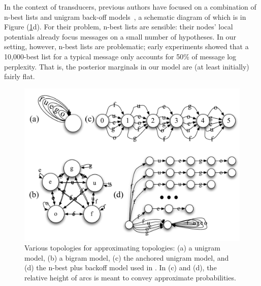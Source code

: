 \documentclass[11pt,a4paper]{article}
\begin{document}
In the context of transducers, previous authors have focused on a
combination of n-best lists and unigram back-off
models~\cite{dreyer2009graphical}, a schematic diagram of which is
in Figure (\ref{fig:fsa}d). For their problem, n-best lists are
sensible: their nodes' local potentials already focus messages on
a small number of hypotheses.  In our setting, however, n-best lists
are problematic; early experiments showed that a 10,000-best list
for a typical message only accounts for 50\% of message log perplexity.
That is, the posterior marginals in our model are (at least initially)
fairly flat.

\begin{figure}
  \centering
  \includegraphics[scale=0.35]{fsa}
  \caption{Various topologies for approximating topologies: (a) a
  unigram model, (b) a bigram model, (c) the anchored unigram model,
  and (d) the n-best plus backoff model used in
  . In (c) and (d), the relative height
  of arcs is meant to convey approximate probabilities.}
  \label{fig:fsa}
\end{figure}
\end{document}
